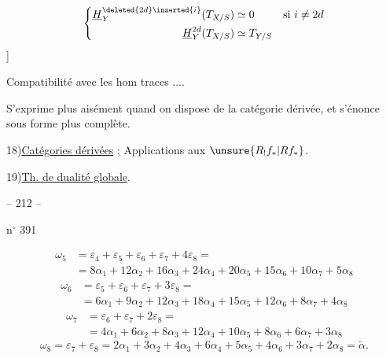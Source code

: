 \[
\left\{\begin{aligned}
\underline H^{\deleted{2d}\inserted{i}}_Y(T_{X/S})&\simeq0
&&\text{si }i\neq2d\\
\underline H^{2d}_Y(T_{X/S})&\simeq T_{Y/S}
\end{aligned}\right.
\]
]

Compatibilité avec les hom traces ....

S'exprime plus aisément quand on dispose de la catégorie dérivée,
et s'énonce sous forme plus complète.

18)\quad\uline{Catégories dérivées} ; Applications aux $\unsure{R_!f_*|Rf_*}$.

19)\quad\uline{Th. de dualité globale}.

\begin{center}-- 212 --\end{center}
\hfill n$^\circ$ 391

\[
\begin{aligned}
\omega_5&=\varepsilon_4+\varepsilon_5+\varepsilon_6+\varepsilon_7+4\varepsilon_8=\\
&=8\alpha_1+12\alpha_2+16\alpha_3+24\alpha_4+20\alpha_5+15\alpha_6+10\alpha_7+5\alpha_8
\end{aligned}
\]
\[
\begin{aligned}
\omega_6&=\varepsilon_5+\varepsilon_6+\varepsilon_7+3\varepsilon_8=\\
&=6\alpha_1+9\alpha_2+12\alpha_3+18\alpha_4+15\alpha_5+12\alpha_6+8\alpha_7+4\alpha_8
\end{aligned}
\]
\[
\begin{aligned}
\omega_7&=\varepsilon_6+\varepsilon_7+2\varepsilon_8=\\
&=4\alpha_1+6\alpha_2+8\alpha_3+12\alpha_4+10\alpha_5+8\alpha_6+6\alpha_7+3\alpha_8
\end{aligned}
\]
\[
\omega_8=\varepsilon_7+\varepsilon_8
=2\alpha_1+3\alpha_2+4\alpha_3+6\alpha_4+5\alpha_5+4\alpha_6+3\alpha_7+2\alpha_8
=\tilde\alpha.
\]

